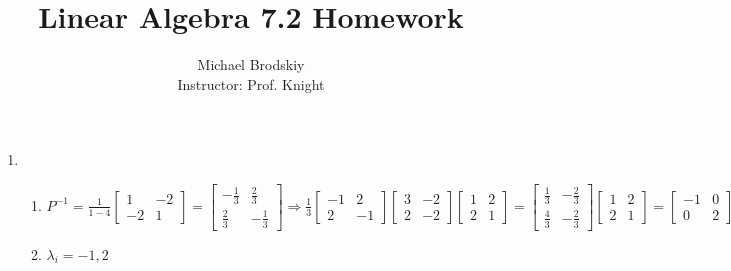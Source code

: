 \documentclass[12pt]{article}
\title{Linear Algebra 7.2 Homework}
\date{}
\author{Michael Brodskiy\\ \small Instructor: Prof. Knight}
\begin{document}
\maketitle

\begin{enumerate}

    \begin{center}
      \underline{3-23 eoo, 25}
    \end{center}

    \setcounter{enumi}{2}

  \item

    \begin{enumerate}

      \item $P^{-1}=\frac{1}{1-4}\begin{bmatrix} 1 & -2\\ -2 & 1  \end{bmatrix}=\begin{bmatrix} -\frac{1}{3} & \frac{2}{3}\\ \frac{2}{3} & -\frac{1}{3}\end{bmatrix}\Rightarrow\frac{1}{3}\begin{bmatrix} -1 & 2\\ 2 & -1\end{bmatrix}\begin{bmatrix} 3 & -2\\ 2 & -2\end{bmatrix}\begin{bmatrix} 1 & 2\\ 2 & 1\end{bmatrix}=\begin{bmatrix} \frac{1}{3} & -\frac{2}{3}\\ \frac{4}{3} & -\frac{2}{3}  \end{bmatrix}\begin{bmatrix} 1 & 2\\ 2 & 1\end{bmatrix}=\begin{bmatrix} -1 & 0\\ 0 & 2 \end{bmatrix}$

      \item $\lambda_i=-1,2$

    \end{enumerate}

    \setcounter{enumi}{6}


\end{enumerate}
\end{document}
